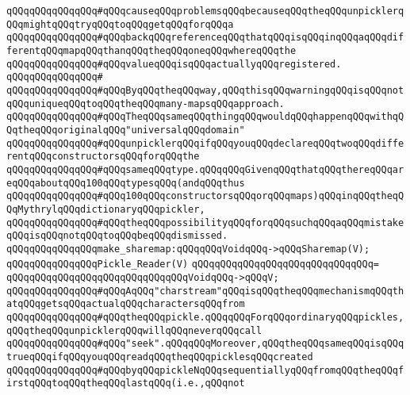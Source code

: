 \verb|qQQqqQQqqQQqqQQq#qQQqcauseqQQqproblemsqQQqbecauseqQQqtheqQQqunpicklerqQQqmightqQQqtryqQQqtoqQQqgetqQQqforqQQqa|\newline
\verb|qQQqqQQqqQQqqQQq#qQQqbackqQQqreferenceqQQqthatqQQqisqQQqinqQQqaqQQqdifferentqQQqmapqQQqthanqQQqtheqQQqoneqQQqwhereqQQqthe|\newline
\verb|qQQqqQQqqQQqqQQq#qQQqvalueqQQqisqQQqactuallyqQQqregistered.|\newline
\verb|qQQqqQQqqQQqqQQq#|\newline
\verb|qQQqqQQqqQQqqQQq#qQQqByqQQqtheqQQqway,qQQqthisqQQqwarningqQQqisqQQqnotqQQquniqueqQQqtoqQQqtheqQQqmany-mapsqQQqapproach.|\newline
\verb|qQQqqQQqqQQqqQQq#qQQqTheqQQqsameqQQqthingqQQqwouldqQQqhappenqQQqwithqQQqtheqQQqoriginalqQQq"universalqQQqdomain"|\newline
\verb|qQQqqQQqqQQqqQQq#qQQqunpicklerqQQqifqQQqyouqQQqdeclareqQQqtwoqQQqdifferentqQQqconstructorsqQQqforqQQqthe|\newline
\verb|qQQqqQQqqQQqqQQq#qQQqsameqQQqtype.qQQqqQQqGivenqQQqthatqQQqthereqQQqareqQQqaboutqQQq100qQQqtypesqQQq(andqQQqthus|\newline
\verb|qQQqqQQqqQQqqQQq#qQQq100qQQqconstructorsqQQqorqQQqmaps)qQQqinqQQqtheqQQqMythrylqQQqdictionaryqQQqpickler,|\newline
\verb|qQQqqQQqqQQqqQQq#qQQqtheqQQqpossibilityqQQqforqQQqsuchqQQqaqQQqmistakeqQQqisqQQqnotqQQqtoqQQqbeqQQqdismissed.|\newline
\newline
\verb|qQQqqQQqqQQqqQQqmake_sharemap:qQQqqQQqVoidqQQq->qQQqSharemap(V);|\newline
\newline
\verb|qQQqqQQqqQQqqQQqPickle_Reader(V)|\newline
\verb|qQQqqQQqqQQqqQQqqQQqqQQqqQQqqQQq=|\newline
\verb|qQQqqQQqqQQqqQQqqQQqqQQqqQQqqQQqVoidqQQq->qQQqV;|\newline
\newline
\verb|qQQqqQQqqQQqqQQq#qQQqAqQQq"charstream"qQQqisqQQqtheqQQqmechanismqQQqthatqQQqgetsqQQqactualqQQqcharactersqQQqfrom|\newline
\verb|qQQqqQQqqQQqqQQq#qQQqtheqQQqpickle.qQQqqQQqForqQQqordinaryqQQqpickles,qQQqtheqQQqunpicklerqQQqwillqQQqneverqQQqcall|\newline
\verb|qQQqqQQqqQQqqQQq#qQQq"seek".qQQqqQQqMoreover,qQQqtheqQQqsameqQQqisqQQqtrueqQQqifqQQqyouqQQqreadqQQqtheqQQqpicklesqQQqcreated|\newline
\verb|qQQqqQQqqQQqqQQq#qQQqbyqQQqpickleNqQQqsequentiallyqQQqfromqQQqtheqQQqfirstqQQqtoqQQqtheqQQqlastqQQq(i.e.,qQQqnot|\newline
